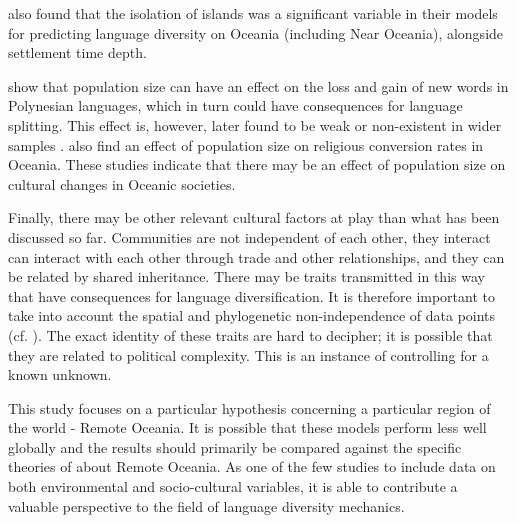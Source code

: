 \documentclass[unnumsec,webpdf,modern,medium]{oup-authoring-template}
\begin{document}
\citet[4-5]{gavin2012island} also found that the isolation of islands was a significant variable in their models for predicting language diversity on Oceania (including Near Oceania), alongside settlement time depth. 

\citet{bromham_polynesian_sizes} show that population size can have an effect on the loss and gain of new words in Polynesian languages, which in turn could have consequences for language splitting. This effect is, however, later found to be weak or non-existent in wider samples \citep{greenhill2018population}. \citet{watts_2018} also find an effect of population size on religious conversion rates in Oceania. These studies indicate that there may be an effect of population size on cultural changes in Oceanic societies.

Finally, there may be other relevant cultural factors at play than what has been discussed so far. Communities are not independent of each other, they interact can interact with each other through trade and other relationships, and they can be related by shared inheritance. There may be traits transmitted in this way that have consequences for language diversification. It is therefore important to take into account the spatial and phylogenetic non-independence of data points (cf. \citet{roberts2015future} \citet{gavin2013toward}). The exact identity of these traits are hard to decipher; it is possible that they are related to political complexity. This is an instance of controlling for a known unknown.

This study focuses on a particular hypothesis concerning a particular region of the world - Remote Oceania. It is possible that these models perform less well globally and the results should primarily be compared against the specific theories of \citet{pawley81, pawley2007} about Remote Oceania. As one of the few studies to include data on both environmental and socio-cultural variables, it is able to contribute a valuable perspective to the field of language diversity mechanics.
\end{document}
